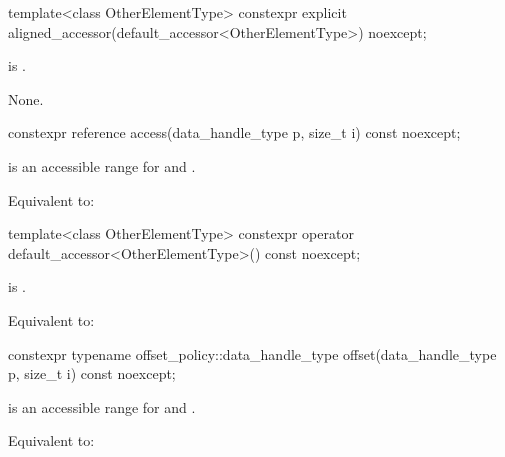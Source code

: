%
\begin{itemdecl}
template<class OtherElementType>
  constexpr explicit aligned_accessor(default_accessor<OtherElementType>) noexcept;
\end{itemdecl}

\begin{itemdescr}
\pnum
\constraints
{}
is .

\pnum
\effects
None.
\end{itemdescr}

%
\begin{itemdecl}
constexpr reference access(data_handle_type p, size_t i) const noexcept;
\end{itemdecl}

\begin{itemdescr}
\pnum
\expects
{} is an accessible range for  and .

\pnum
\effects
Equivalent to: 
\end{itemdescr}

%
\begin{itemdecl}
template<class OtherElementType>
  constexpr operator default_accessor<OtherElementType>() const noexcept;
\end{itemdecl}

\begin{itemdescr}
\pnum
\constraints
{}
is .

\pnum
\effects
Equivalent to: 
\end{itemdescr}

%
\begin{itemdecl}
constexpr typename offset_policy::data_handle_type
  offset(data_handle_type p, size_t i) const noexcept;
\end{itemdecl}

\begin{itemdescr}
\pnum
\expects
{} is an accessible range for  and .

\pnum
\effects
Equivalent to: 
\end{itemdescr}

